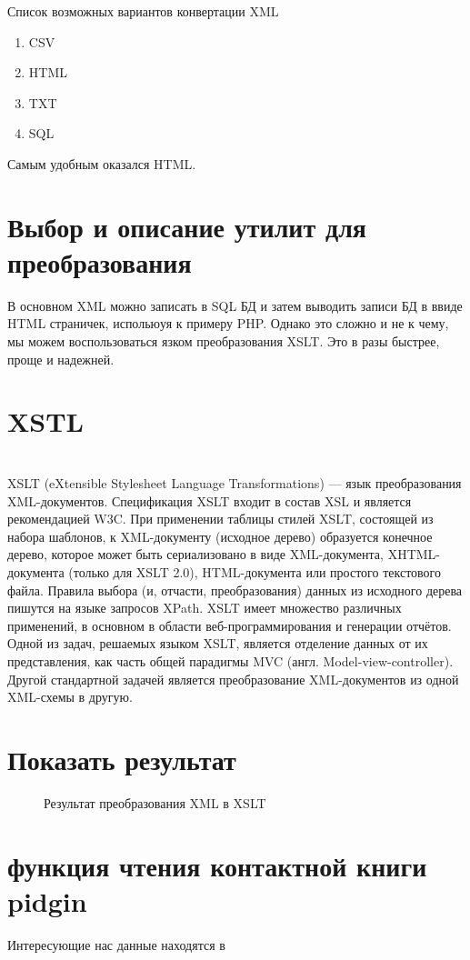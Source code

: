 Список возможных вариантов конвертации XML
\begin{enumerate}
\item CSV
\item HTML
\item TXT
\item SQL
\end{enumerate}
Самым удобным оказался HTML.
\chapter*{Выбор и описание утилит для преобразования}
В основном XML можно записать в SQL БД и затем выводить записи БД в ввиде HTML страничек, испольюуя к примеру PHP. Однако это сложно и не к чему, мы можем воспользоваться язком преобразования XSLT. Это в разы быстрее, проще и надежней.
\chapter*{XSTL}
\\XSLT (eXtensible Stylesheet Language Transformations) — язык преобразования XML-документов. Спецификация XSLT входит в состав XSL и является рекомендацией W3C.
При применении таблицы стилей XSLT, состоящей из набора шаблонов, к XML-документу (исходное дерево) образуется конечное дерево, которое может быть сериализовано в виде XML-документа, XHTML-документа (только для XSLT 2.0), HTML-документа или простого текстового файла. Правила выбора (и, отчасти, преобразования) данных из исходного дерева пишутся на языке запросов XPath.
XSLT имеет множество различных применений, в основном в области веб-программирования и генерации отчётов. Одной из задач, решаемых языком XSLT, является отделение данных от их представления, как часть общей парадигмы MVC (англ. Model-view-controller). Другой стандартной задачей является преобразование XML-документов из одной XML-схемы в другую.
\chapter*{Показать результат}
\begin{figure}[h]
\caption{Результат преобразования XML в XSLT}
\label{pic:xml_to_xslt}
\end{figure}
\chapter*{функция чтения контактной книги pidgin}
Интересующие нас данные находятся в %
